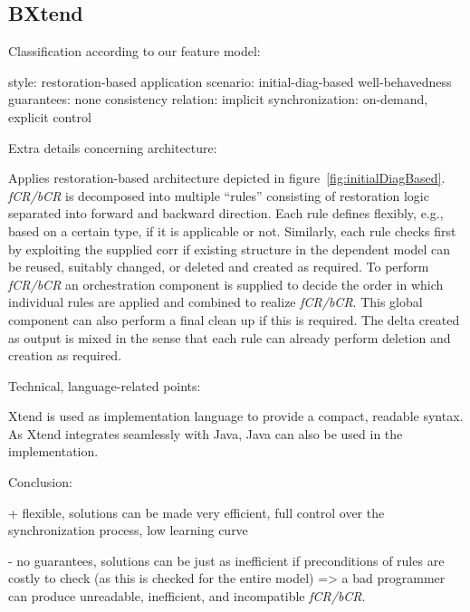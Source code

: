\subsection{BXtend}
\label{sec:BXtend}


Classification according to our feature model:

style:  restoration-based
application scenario:  initial-diag-based
well-behavedness guarantees: none
consistency relation: implicit
synchronization: on-demand, explicit control

Extra details concerning architecture:

Applies restoration-based architecture depicted in figure~\ref{fig:initialDiagBased}.
\emph{fCR/bCR} is decomposed into multiple ``rules'' consisting of restoration logic separated into forward and backward direction.
Each rule defines flexibly, e.g., based on a certain type, if it is applicable or not.
Similarly, each rule checks first by exploiting the supplied corr if existing structure in the dependent model can be reused, suitably changed, or deleted and created as required.
To perform \emph{fCR/bCR} an orchestration component is supplied to decide the order in which individual rules are applied and combined to realize \emph{fCR/bCR}.
This global component can also perform a final clean up if this is required.
The delta created as output is mixed in the sense that each rule can already perform deletion and creation as required.

Technical, language-related points:

Xtend is used as implementation language to provide a compact, readable syntax.
As Xtend integrates seamlessly with Java, Java can also be used in the implementation.

Conclusion:

+ flexible, solutions can be made very efficient, full control over the synchronization process, low learning curve

- no guarantees, solutions can be just as inefficient if preconditions of rules are costly to check (as this is checked for the entire model) => a bad programmer can produce unreadable, inefficient, and incompatible \emph{fCR/bCR}.